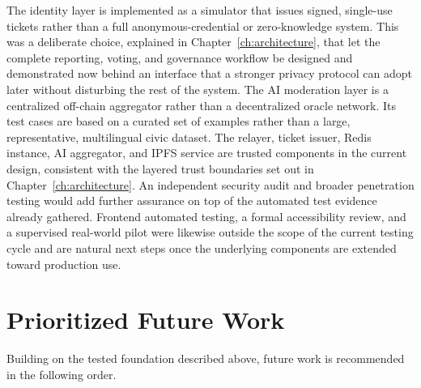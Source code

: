 The identity layer is implemented as a simulator that issues signed, single-use tickets rather than a full anonymous-credential or zero-knowledge system. This was a deliberate choice, explained in Chapter~\ref{ch:architecture}, that let the complete reporting, voting, and governance workflow be designed and demonstrated now behind an interface that a stronger privacy protocol can adopt later without disturbing the rest of the system. The AI moderation layer is a centralized off-chain aggregator rather than a decentralized oracle network. Its test cases are based on a curated set of examples rather than a large, representative, multilingual civic dataset. The relayer, ticket issuer, Redis instance, AI aggregator, and IPFS service are trusted components in the current design, consistent with the layered trust boundaries set out in Chapter~\ref{ch:architecture}. An independent security audit and broader penetration testing would add further assurance on top of the automated test evidence already gathered. Frontend automated testing, a formal accessibility review, and a supervised real-world pilot were likewise outside the scope of the current testing cycle and are natural next steps once the underlying components are extended toward production use.

\section{Prioritized Future Work}
\label{sec:future-work}

Building on the tested foundation described above, future work is recommended in the following order.

